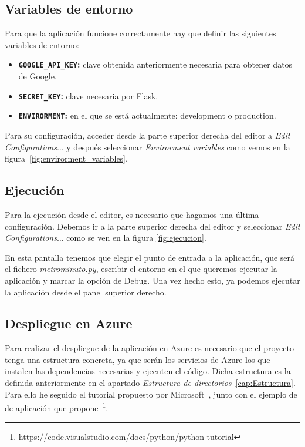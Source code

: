 \subsection{Variables de entorno}\label{variables_entorno}
Para que la aplicación funcione correctamente hay que definir las siguientes variables de entorno:
\begin{itemize}
	\item \textbf{\texttt{GOOGLE\_API\_KEY}:} clave obtenida anteriormente necesaria para obtener datos de Google.
	\item \textbf{\texttt{SECRET\_KEY}:} clave necesaria por Flask.
	\item \textbf{\texttt{ENVIRORMENT}:} en el que se está actualmente: development o production.
\end{itemize}
Para su configuración, acceder desde la parte superior derecha del editor a \textit{Edit Configurations$\dots$} y después seleccionar \textit{Envirorment variables} como vemos en la figura~\ref{fig:envirorment_variables}.

\subsection{Ejecución}
Para la ejecución desde el editor, es necesario que hagamos una última configuración. Debemos ir a la parte superior derecha del editor y seleccionar \textit{Edit Configurations$\dots$} como se ven en la figura \ref{fig:ejecucion}.

En esta pantalla tenemos que elegir el punto de entrada a la aplicación, que será el fichero \textit{metrominuto.py}, escribir el entorno en el que queremos ejecutar la aplicación y marcar la opción de Debug. Una vez hecho esto, ya podemos ejecutar la aplicación desde el panel superior derecho.

\subsection{Despliegue en Azure}
Para realizar el despliegue de la aplicación en Azure es necesario que el proyecto tenga una estructura concreta, ya que serán los servicios de Azure los que instalen las dependencias necesarias y ejecuten el código. Dicha estructura es la definida anteriormente en el apartado \textit{Estructura de directorios}~\ref{cap:Estructura}. Para ello he seguido el tutorial propuesto por Microsoft~\cite{deploy-flask-azure}, junto con el ejemplo de de aplicación que propone~\footnote{\url{https://code.visualstudio.com/docs/python/python-tutorial}}.

